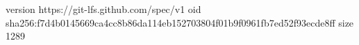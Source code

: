 version https://git-lfs.github.com/spec/v1
oid sha256:f7d4b0145669ca4cc8b86da114eb152703804f01b9f0961fb7ed52f93ecde8ff
size 1289
